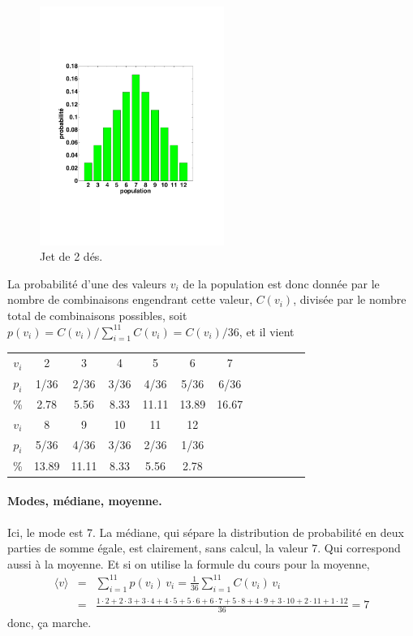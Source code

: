 \begin{figure}
	\centering
	\vspace{-5mm}
	\includegraphics[width=6.0cm]{assets/figures/Serie2_exe01fig1.pdf}
	\caption{Jet de 2 dés.}
	\label{fig:exe1fig1}
\end{figure}
La probabilité d'une des valeurs $v_i$ de la population est donc donnée par le nombre de combinaisons engendrant cette valeur, $C(v_i)$, divisée par le nombre total de combinaisons possibles, soit $p(v_i)=C(v_i)/\sum_{i=1}^{11}C(v_i)=C(v_i)/36$, et il vient\vspace{1mm}\\
\begin{tabular}{c|ccccccccccc}\hline
$v_i$ & 2 & 3 & 4 & 5 & 6 & 7 \\
$p_i$ & 1/36 & 2/36 & 3/36 & 4/36 & 5/36 & 6/36 \\
\%    & 2.78 & 5.56 & 8.33 & 11.11 & 13.89 & 16.67 \\\hline\hline
$v_i$ & 8 & 9 & 10 & 11 & 12 \\
$p_i$ & 5/36 & 4/36 & 3/36 & 2/36 & 1/36 \\
\%    & 13.89 & 11.11 & 8.33 & 5.56 & 2.78 \\\hline
\end{tabular}

\paragraph{Modes, médiane, moyenne.} Ici, le mode est 7. La médiane, qui sépare la distribution de probabilité en deux parties de somme égale, est clairement, sans calcul, la valeur 7. Qui correspond aussi à la moyenne. Et si on utilise la formule du cours pour la moyenne,
\begin{eqnarray*}
\langle v \rangle&=&\sum\limits_{i=1}^{11}p(v_i)\,v_i=\frac{1}{36}\sum\limits_{i=1}^{11}C(v_i)\,v_i
\\
&=&\frac{1\cdot 2+2\cdot 3+3\cdot 4+4\cdot 5+5\cdot 6+6\cdot 7+5\cdot 8
+4\cdot 9+3\cdot 10+2\cdot 11+1\cdot 12}{36}=7
\end{eqnarray*}
donc, ça marche.

